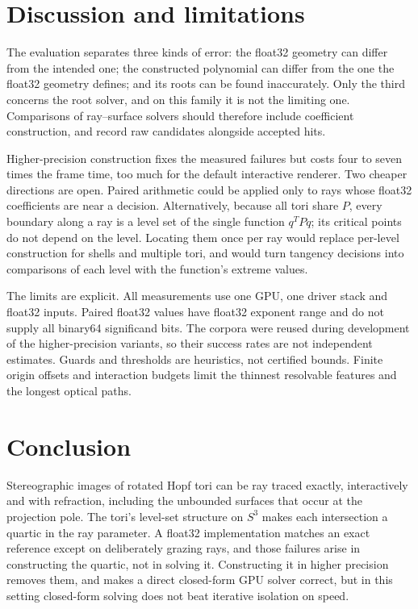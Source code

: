 \documentclass{jcgt}
\begin{document}
\section{Discussion and limitations}\label{discussion-and-limitations}

The evaluation separates three kinds of error: the float32 geometry can
differ from the intended one; the constructed polynomial can differ from
the one the float32 geometry defines; and its roots can be found
inaccurately. Only the third concerns the root solver, and on this
family it is not the limiting one. Comparisons of ray--surface solvers
should therefore include coefficient construction, and record raw
candidates alongside accepted hits.

Higher-precision construction fixes the measured failures but costs four
to seven times the frame time, too much for the default interactive
renderer. Two cheaper directions are open. Paired arithmetic could be
applied only to rays whose float32 coefficients are near a decision.
Alternatively, because all tori share \(P\), every boundary along a ray
is a level set of the single function \(q^TPq\); its critical points do
not depend on the level. Locating them once per ray would replace
per-level construction for shells and multiple tori, and would turn
tangency decisions into comparisons of each level with the function's
extreme values.

The limits are explicit. All measurements use one GPU, one driver stack
and float32 inputs. Paired float32 values have float32 exponent range
and do not supply all binary64 significand bits. The corpora were reused
during development of the higher-precision variants, so their success
rates are not independent estimates. Guards and thresholds are
heuristics, not certified bounds. Finite origin offsets and interaction
budgets limit the thinnest resolvable features and the longest optical
paths.

\section{Conclusion}\label{conclusion}

Stereographic images of rotated Hopf tori can be ray traced exactly,
interactively and with refraction, including the unbounded surfaces that
occur at the projection pole. The tori's level-set structure on \(S^3\)
makes each intersection a quartic in the ray parameter. A float32
implementation matches an exact reference except on deliberately grazing
rays, and those failures arise in constructing the quartic, not in
solving it. Constructing it in higher precision removes them, and makes
a direct closed-form GPU solver correct, but in this setting closed-form
solving does not beat iterative isolation on speed.
\end{document}
